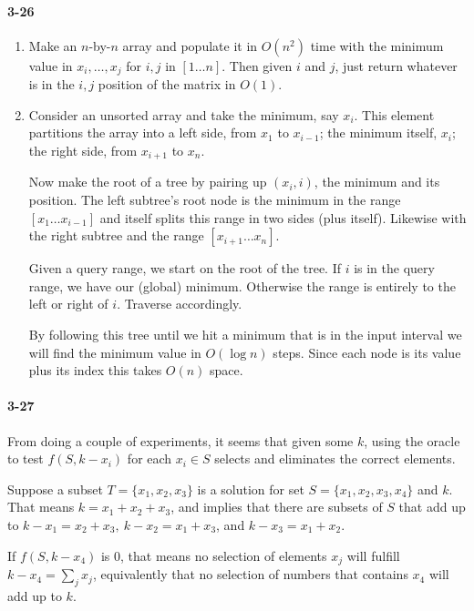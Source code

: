 \documentclass{report}
\begin{document}
\paragraph{3-26}
\begin{enumerate}[label=\alph*)]
	\item Make an $n$-by-$n$ array and populate it in $O(n^2)$ time with the minimum value in $x_i,\ldots,x_j$ for $i,j$ in $[1\ldots n]$. Then given $i$ and $j$, just return whatever is in the $i,j$ position of the matrix in $O(1)$.
	\item Consider an unsorted array and take the minimum, say $x_i$. This element partitions the array into a left side, from $x_1$ to $x_{i-1}$; the minimum itself, $x_i$; the right side, from $x_{i+1}$ to $x_n$.
	
	Now make the root of a tree by pairing up $(x_i, i)$, the minimum and its position. The left subtree's root node is the minimum in the range $[x_1\ldots x_{i-1}]$ and itself splits this range in two sides (plus itself). Likewise with the right subtree and the range $[x_{i+1}\ldots x_n]$.
	
	Given a query range, we start on the root of the tree. If $i$ is in the query range, we have our (global) minimum. Otherwise the range is entirely to the left or right of $i$. Traverse accordingly.

	By following this tree until we hit a minimum that is in the input interval we will find the minimum value in $O(\log n)$ steps. Since each node is its value plus its index this takes $O(n)$ space.	
\end{enumerate}

\paragraph{3-27} From doing a couple of experiments, it seems that given some $k$, using the oracle to test $f(S, k-x_i)$ for each $x_i\in S$ selects and eliminates the correct elements.

Suppose a subset $T=\{x_1, x_2, x_3\}$ is a solution for set $S=\{x_1, x_2, x_3, x_4\}$ and $k$. That means $k = x_1+x_2+x_3$, and implies that there are subsets of $S$ that add up to $k-x_1=x_2+x_3,\ k-x_2=x_1+x_3$, and $k-x_3=x_1+x_2$.

If $f(S, k-x_4)$ is 0, that means no selection of elements $x_j$ will fulfill $k-x_4=\sum_j x_j$, equivalently that no selection of numbers that contains $x_4$ will add up to $k$.
\end{document}

